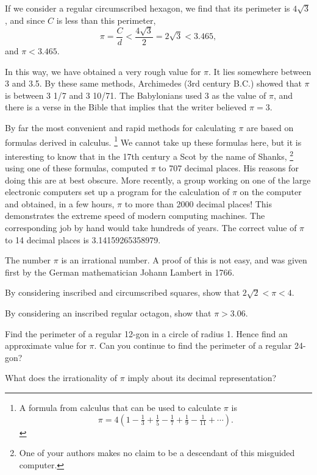 \documentclass[11pt]{book}
\theoremstyle{bkplain}
\theoremstyle{XIplainnote}
\theoremstyle{bkplain}
\newcommand{\XIsymfoot}[1]{%
  \begingroup\renewcommand{\thefootnote}{\fnsymbol{footnote}}%
  \footnote{#1}\endgroup}
\theoremstyle{bkplain}
\begin{document}
If we consider a regular circumscribed hexagon, we find that its perimeter is
$4\sqrt{3}$, and since $C$ is less than this perimeter,
\[
\pi = \frac{C}{d} < \frac{4\sqrt{3}}{2} = 2\sqrt{3} < 3.465,
\]
and $\pi < 3.465$.

In this way, we have obtained a very rough value for $\pi$. It lies somewhere
between 3 and 3.5. By these same methods, Archimedes (3rd century B.C.) showed
that $\pi$ is between 3 1/7 and 3 10/71. The Babylonians used 3 as the value of
$\pi$, and there is a verse in the Bible that implies that the writer believed
$\pi = 3$.

By far the most convenient and rapid methods for calculating $\pi$ are based on
formulas derived in calculus.\XIsymfoot{A formula from calculus that can be
used to calculate $\pi$ is
\[
\pi = 4\left(1 - \tfrac{1}{3} + \tfrac{1}{5} - \tfrac{1}{7} + \tfrac{1}{9}
- \tfrac{1}{11} + \cdots\right).
\]}
We cannot take up these formulas here, but it is interesting to know that in
the 17th century a Scot by the name of Shanks,\XIsymfoot{One of your authors
makes no claim to be a descendant of this misguided computer.} using one of
these formulas, computed $\pi$ to 707 decimal places. His reasons for doing
this are at best obscure. More recently, a group working on one of the large
electronic computers set up a program for the calculation of $\pi$ on the
computer and obtained, in a few hours, $\pi$ to more than 2000 decimal places!
This demonstrates the extreme speed of modern computing machines. The
corresponding job by hand would take hundreds of years. The correct value of
$\pi$ to 14 decimal places is 3.14159265358979.

The number $\pi$ is an irrational number. A proof of this is not easy, and was
given first by the German mathematician Johann Lambert in 1766.

\begin{exercisecols}
\begin{exlist}
\item By considering inscribed and circumscribed squares, show that
      $2\sqrt{2} < \pi < 4$.
\item[\stex 2.] By considering an inscribed regular octagon, show that
      $\pi > 3.06$.
\item[\stex 3.] Find the perimeter of a regular 12-gon in a circle of radius 1.
      Hence find an approximate value for $\pi$. Can you continue to find the
      perimeter of a regular 24-gon?
\item[4.] What does the irrationality of $\pi$ imply about its decimal
      representation?
\end{exlist}
\end{exercisecols}
\end{document}
